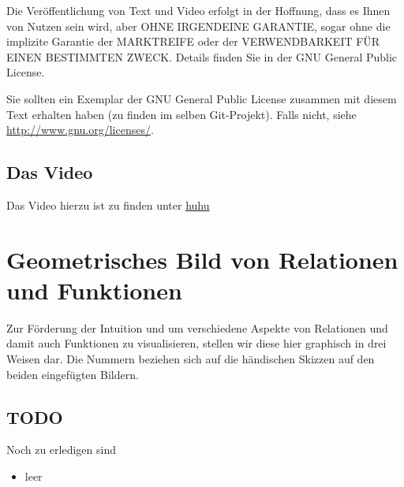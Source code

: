 \documentclass[a4paper]{amsart}
\theoremstyle{definition}
\begin{document}
Die Veröffentlichung von Text und Video erfolgt in der Hoffnung, dass es Ihnen von Nutzen sein wird, 
aber OHNE IRGENDEINE GARANTIE, sogar ohne die implizite Garantie der MARKTREIFE oder der 
VERWENDBARKEIT FÜR EINEN BESTIMMTEN ZWECK. Details finden Sie in der GNU General Public License.

Sie sollten ein Exemplar der GNU General Public License zusammen mit diesem Text erhalten haben 
(zu finden im selben Git-Projekt). 
Falls nicht, siehe \url{http://www.gnu.org/licenses/}.

\subsection*{Das Video}
Das Video hierzu ist zu finden unter 
{\tiny
   \url{huhu}
}

\section{Geometrisches Bild von Relationen und Funktionen}

Zur Förderung der Intuition und um verschiedene Aspekte von Relationen und damit auch Funktionen zu visualisieren, stellen wir diese hier graphisch in drei Weisen dar. Die Nummern beziehen sich auf die händischen Skizzen auf den beiden eingefügten Bildern.



\begin{backup}
\section{TODO}
Noch zu erledigen sind
\begin{itemize}
   \item leer
\end{itemize}
\end{backup}
\end{document}
